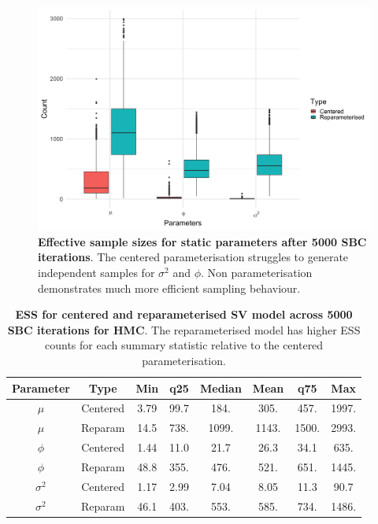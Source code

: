 \documentclass[12pt, a4paper]{article}
\begin{document}
    \begin{figure}[H]
        \centering
        \includegraphics[scale=0.09]{results/hmc_ess.png}
        \caption{\textbf{Effective sample sizes for static parameters after 5000 SBC iterations}. The centered parameterisation struggles to generate independent samples for $\sigma^2$ and $\phi$. Non parameterisation demonstrates much more efficient sampling behaviour.}
        \label{fig:hmcess}
    \end{figure}

    \begin{table}[H]
        \centering
        \begin{tabular}{|c|c|c|c|c|c|c|c|} \hline 
        Parameter &  Type&Min& q25&  Median& Mean & q75&Max\\ \hline 
        $\mu$&  Centered&3.79 & 99.7 & 184. & 305. & 457. & 1997.  \\
     $\mu$&  Reparam&14.5 & 738. & 1099. & 1143. & 1500. & 2993.  \\\hline 
     $\phi$&  Centered&1.44 & 11.0 & 21.7 & 26.3 & 34.1 & 635.  \\
     $\phi$&  Reparam&48.8 & 355. & 476. & 521. & 651. & 1445.   \\ \hline 
     $\sigma^2$&  Centered& 1.17 & 2.99 & 7.04 & 8.05 & 11.3 & 90.7 \\ 
     $\sigma^2$&  Reparam&46.1 & 403. & 553. & 585. & 734. & 1486. \\ \hline
        \end{tabular}
        \caption{\textbf{ESS for centered and reparameterised SV model across 5000 SBC iterations for HMC}. The reparameterised model has higher ESS counts for each summary statistic relative to the centered parameterisation.}
        \label{tab:hmcess}
    \end{table}
\end{document}
